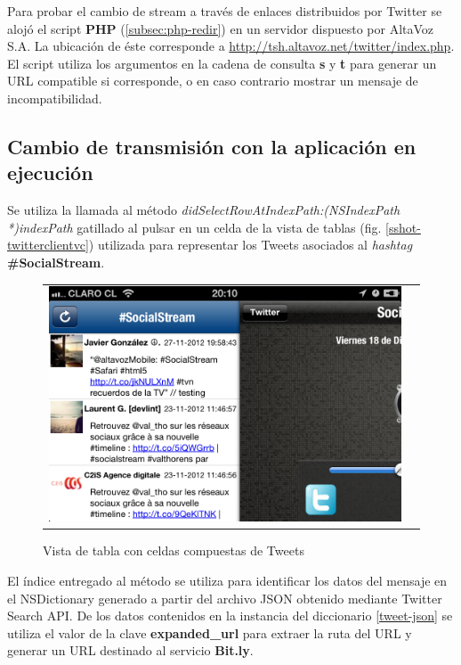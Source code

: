 Para probar el cambio de stream a través de enlaces distribuidos por Twitter se alojó el script \textbf{PHP} (\ref{subsec:php-redir}) en un servidor dispuesto por AltaVoz S.A. La ubicación de éste corresponde a \url{http://tsh.altavoz.net/twitter/index.php}.
El script utiliza los argumentos en la cadena de consulta \textbf{s} y \textbf{t} para generar un URL compatible si corresponde, o en caso contrario mostrar un mensaje de incompatibilidad.

  \subsection{Cambio de transmisión con la aplicación en ejecución}
  \label{subsec:ts-inside}
Se utiliza la llamada al método \textit{didSelectRowAtIndexPath:(NSIndexPath *)indexPath} gatillado al pulsar en un celda de la vista de tablas (fig. \ref{sshot-twitterclientvc}) utilizada para representar los Tweets asociados al \textit{hashtag} \textbf{\#SocialStream}. \\

\begin{figure}[H]
	\centering
	\begin{tabular}{cc}
	\includegraphics[scale=0.3]{imgs/twclient-list.png}
	\end{tabular}
	\caption{Vista de tabla con celdas compuestas de Tweets}
	\label{fig:twclient-list}
\end{figure}

El índice entregado al método se utiliza para identificar los datos del mensaje en el NSDictionary generado a partir del archivo JSON obtenido mediante Twitter Search API. De los datos contenidos en la instancia del diccionario \ref{tweet-json} se utiliza el valor de la clave \textbf{expanded\_url} para extraer la ruta del URL y generar un URL destinado al servicio \textbf{Bit.ly}.  \\

